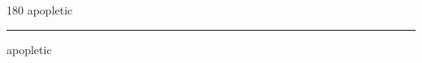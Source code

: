 
\begin{frame}
\begin{center}
\begin{turn}{180}
{\fontsize{2.5cm}{1em}\selectfont apopletic}
\end{turn}
\vspace{1em}\par  
\hrule
\vspace{1em}\par  
{\fontsize{2.5cm}{1em}\selectfont apopletic}
\end{center}
\end{frame}

